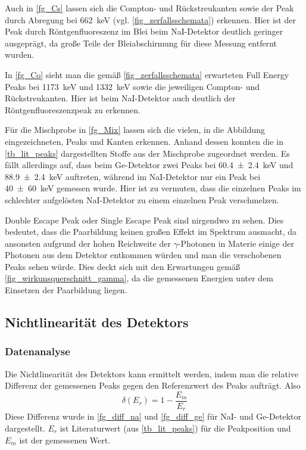 \documentclass[
	a4paper,
	12pt,
	pagesize,
	ngerman
]{scrartcl}
\begin{document}
Auch in \cref{fg_Cs} lassen sich die Compton- und Rückstreukanten sowie der Peak durch Abregung bei \SI{662}{keV} (vgl. \cref{fig_zerfallsschemata}) erkennen.
Hier ist der Peak durch Röntgenfluoreszenz im Blei beim NaI-Detektor deutlich geringer ausgeprägt, da große Teile der Bleiabschirmung für diese Messung entfernt wurden.

In \cref{fg_Co} sieht man die gemäß \cref{fig_zerfallsschemata} erwarteten Full Energy Peaks bei \SI{1173}{keV} und \SI{1332}{keV} sowie die jeweiligen Compton- und Rückstreukanten.
Hier ist beim NaI-Detektor auch deutlich der Röntgenfluoreszenzpeak zu erkennen.

Für die Mischprobe in \cref{fg_Mix} lassen sich die vielen, in die Abbildung eingezeichneten, Peaks und Kanten erkennen.
Anhand dessen konnten die in \cref{tb_lit_peaks} dargestellten Stoffe aus der Mischprobe zugeordnet werden.
Es fällt allerdings auf, dass beim Ge-Detektor zwei Peaks bei \SI{60.4\pm 2.4}{keV} und \SI{88.9\pm 2.4}{keV} auftreten, während im NaI-Detektor nur ein Peak bei \SI{40\pm 60}{keV} gemessen wurde.
Hier ist zu vermuten, dass die einzelnen Peaks im schlechter aufgelösten NaI-Detektor zu einem einzelnen Peak verschmelzen.

Double Escape Peak oder Single Escape Peak sind nirgendwo zu sehen.
Dies bedeutet, dass die Paarbildung keinen großen Effekt im Spektrum ausmacht, da ansonsten aufgrund der hohen Reichweite der $\gamma$-Photonen in Materie einige der Photonen aus dem Detektor entkommen würden und man die verschobenen Peaks sehen würde.
Dies deckt sich mit den Erwartungen gemäß \cref{fig_wirkunsquerschnitt_gamma}, da die gemessenen Energien unter dem Einsetzen der Paarbildung liegen.

\subsection{Nichtlinearität des Detektors}
\subsubsection{Datenanalyse}
Die Nichtlinearität des Detektors kann ermittelt werden, indem man die relative Differenz der gemessenen Peaks gegen den Referenzwert des Peaks aufträgt.
Also
\begin{equation}
	\delta(E_r) = 1- \frac{E_m}{E_r}
\end{equation}
Diese Differenz wurde  in \cref{fg_diff_na} und \cref{fg_diff_ge} für NaI- und Ge-Detektor dargestellt.
$E_r$ ist Literaturwert (aus \cref{tb_lit_peaks}) für die Peakposition und $E_m$ ist der gemessenen Wert.
\end{document}
